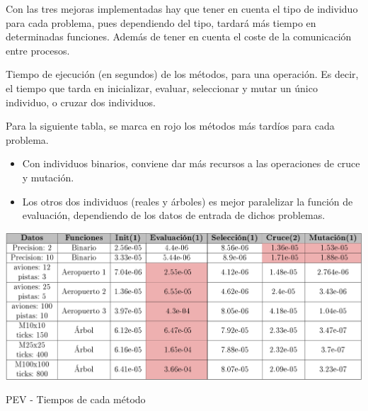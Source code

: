 	Con las tres mejoras implementadas hay que tener en cuenta el tipo de individuo para cada problema, pues dependiendo del tipo, tardará más tiempo en determinadas funciones. Además de tener en cuenta el coste de la comunicación entre procesos.
	
	Tiempo de ejecución (en segundos) de los métodos, para una operación. Es decir, el tiempo que tarda en inicializar, evaluar, seleccionar y mutar un único individuo, o cruzar dos individuos. 
	
	\vspace{0.3cm}

	Para la siguiente tabla, se marca en rojo los métodos más tardíos para cada problema. 
	\begin{itemize}
		\item Con individuos binarios, conviene dar más recursos a las operaciones de cruce y mutación.
		\item Los otros dos individuos (reales y árboles) es mejor paralelizar la función de evaluación, dependiendo de los datos de entrada de dichos problemas.
	\end{itemize}
 
	

	
	\begin{table}[!h]
		\centering
		\includegraphics[width=1\textwidth]{images/chapter_4/tabla_pev}		
		\caption{PEV - Tiempos de cada método}
		\label{tab:pev}
	\end{table}
	
